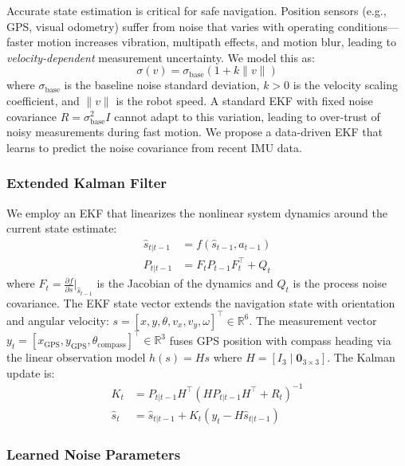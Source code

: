 \documentclass[letterpaper, 10 pt, conference]{ieeeconf}
\begin{document}
Accurate state estimation is critical for safe navigation. Position sensors (e.g., GPS, visual odometry) suffer from noise that varies with operating conditions---faster motion increases vibration, multipath effects, and motion blur, leading to \emph{velocity-dependent} measurement uncertainty. We model this as:
\begin{equation}
    \sigma(v) = \sigma_{\text{base}}(1 + k \|v\|)
    \label{eq:vel_noise}
\end{equation}
where $\sigma_{\text{base}}$ is the baseline noise standard deviation, $k > 0$ is the velocity scaling coefficient, and $\|v\|$ is the robot speed. A standard EKF with fixed noise covariance $R = \sigma_{\text{base}}^2 I$ cannot adapt to this variation, leading to over-trust of noisy measurements during fast motion. We propose a data-driven EKF that learns to predict the noise covariance from recent IMU data.

\subsubsection{Extended Kalman Filter}

We employ an EKF that linearizes the nonlinear system dynamics around the current state estimate:
\begin{align}
    \hat{s}_{t|t-1} &= f(\hat{s}_{t-1}, a_{t-1}) \\
    P_{t|t-1} &= F_t P_{t-1} F_t^\top + Q_t
\end{align}
where $F_t = \frac{\partial f}{\partial s}\big|_{\hat{s}_{t-1}}$ is the Jacobian of the dynamics and $Q_t$ is the process noise covariance. The EKF state vector extends the navigation state with orientation and angular velocity: $s = [x,y,\theta,v_x,v_y,\omega]^\top \in \mathbb{R}^6$. The measurement vector $y_t = [x_{\text{GPS}}, y_{\text{GPS}}, \theta_{\text{compass}}]^\top \in \mathbb{R}^3$ fuses GPS position with compass heading via the linear observation model $h(s) = H s$ where $H = [I_3 \mid \mathbf{0}_{3\times3}]$. The Kalman update is:
\begin{align}
    K_t &= P_{t|t-1} H^\top (H P_{t|t-1} H^\top + R_t)^{-1} \\
    \hat{s}_t &= \hat{s}_{t|t-1} + K_t(y_t - H\hat{s}_{t|t-1})
\end{align}

\subsubsection{Learned Noise Parameters}
\end{document}
